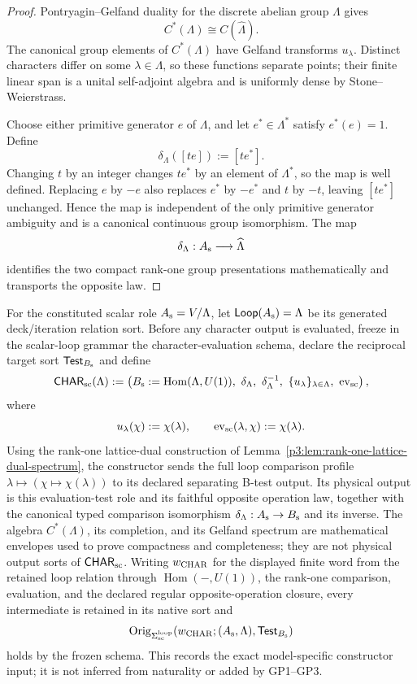 \documentclass[12pt,a4paper]{article}
\begin{document}
\begin{proof}
Pontryagin--Gelfand duality for the discrete abelian group \(\Lambda\)
gives
\[
        C^*(\Lambda)\cong C(\widehat\Lambda).
\]
The canonical group elements of \(C^*(\Lambda)\) have Gelfand transforms
\(u_\lambda\).  Distinct characters differ on some
\(\lambda\in\Lambda\), so these functions separate points; their finite
linear span is a unital self-adjoint algebra and is uniformly dense by
Stone--Weierstrass.

Choose either primitive generator \(e\) of \(\Lambda\), and let
\(e^*\in\Lambda^*\) satisfy \(e^*(e)=1\).  Define
\[
        \delta_\Lambda([te]):=[te^*].
\]
Changing \(t\) by an integer changes \(te^*\) by an element of
\(\Lambda^*\), so the map is well defined.  Replacing \(e\) by \(-e\)
also replaces \(e^*\) by \(-e^*\) and \(t\) by \(-t\), leaving
\([te^*]\) unchanged.  Hence the map is independent of the only primitive
generator ambiguity and is a canonical continuous group isomorphism.
The map
\[
        \delta_\Lambda:
        A_{\rm s}\longrightarrow\widehat\Lambda
\]
identifies the two compact rank-one group presentations mathematically and
transports the opposite law.
\end{proof}

\begin{definition}
\label{p3a:def:scalar-loop-character-constructor}
For the constituted scalar role \(A_{\rm s}=V/\Lambda\), let
\(\mathsf{Loop}(A_{\rm s})=\Lambda\) be its generated deck/iteration relation
sort.  Before any character output is evaluated, freeze in the scalar-loop
grammar the character-evaluation schema, declare the reciprocal target sort
\(\mathsf{Test}_{B_{\rm s}}\) and define
\[
 \mathsf{CHAR}_{\rm sc}(\Lambda)
 :=
 \left(
 B_{\rm s}:=\operatorname{Hom}(\Lambda,U(1)),
 \ \delta_\Lambda,\ \delta_\Lambda^{-1},
 \ \{u_\lambda\}_{\lambda\in\Lambda},
 \ \operatorname{ev}_{\rm sc}
 \right),
\]
where
\[
 u_\lambda(\chi):=\chi(\lambda),
 \qquad
 \operatorname{ev}_{\rm sc}(\lambda,\chi):=\chi(\lambda).
\]
Using the rank-one lattice-dual construction of
Lemma~\ref{p3:lem:rank-one-lattice-dual-spectrum}, the constructor sends the
full loop comparison profile
\(\lambda\mapsto(\chi\mapsto\chi(\lambda))\) to its declared separating
B-test output.  Its physical output is this evaluation-test role and its
faithful opposite operation law, together with the canonical typed comparison
isomorphism \(\delta_\Lambda:A_{\rm s}\to B_{\rm s}\) and its inverse.  The
algebra \(C^*(\Lambda)\), its completion, and its Gelfand spectrum are
mathematical envelopes used to prove compactness and completeness; they are
not physical output sorts of \(\mathsf{CHAR}_{\rm sc}\).
Writing \(w_{\rm CHAR}\) for the displayed finite word from the retained loop
relation through \(\operatorname{Hom}(-,U(1))\), the rank-one comparison,
evaluation, and the declared regular opposite-operation closure, every
intermediate is retained in its native sort and
\[
 \operatorname{Orig}_{\Sigma_{\rm sc}^{\rm loop}}
 (w_{\rm CHAR};(A_{\rm s},\Lambda),\mathsf{Test}_{B_{\rm s}})
\]
holds by the frozen schema.  This records the exact model-specific constructor
input; it is not inferred from naturality or added by GP1--GP3.
\end{definition}
\end{document}

